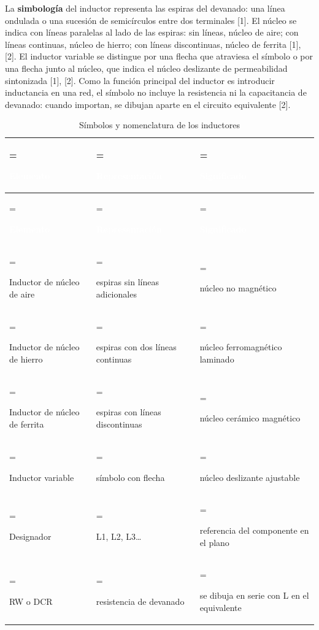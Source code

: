 \documentclass[11pt,letterpaper]{article}
\begin{document}
La \textbf{simbología} del inductor representa las espiras del devanado: una línea ondulada o una sucesión de semicírculos entre dos terminales [1]. El núcleo se indica con líneas paralelas al lado de las espiras: sin líneas, núcleo de aire; con líneas continuas, núcleo de hierro; con líneas discontinuas, núcleo de ferrita [1], [2]. El inductor variable se distingue por una flecha que atraviesa el símbolo o por una flecha junto al núcleo, que indica el núcleo deslizante de permeabilidad sintonizada [1], [2]. Como la función principal del inductor es introducir inductancia en una red, el símbolo no incluye la resistencia ni la capacitancia de devanado: cuando importan, se dibujan aparte en el circuito equivalente [2].

\begin{xltabular}{\linewidth}{>{\hsize\linewidth=\hsize\raggedright\arraybackslash}X>{\hsize\linewidth=\hsize\raggedright\arraybackslash}X>{\hsize\linewidth=\hsize\raggedright\arraybackslash}X}
\caption{Símbolos y nomenclatura de los inductores} \\
 \textcolor{white}{\textbf{Elemento}} & \textcolor{white}{\textbf{Representación}} & \textcolor{white}{\textbf{Significado}} \\
\endfirsthead
{} \textcolor{white}{\textbf{Elemento}} & \textcolor{white}{\textbf{Representación}} & \textcolor{white}{\textbf{Significado}} \\
\endhead
\bottomrule
\endlastfoot
  Inductor de núcleo de aire & espiras sin líneas adicionales & núcleo no magnético \\
   Inductor de núcleo de hierro & espiras con dos líneas continuas & núcleo ferromagnético laminado \\
  Inductor de núcleo de ferrita & espiras con líneas discontinuas & núcleo cerámico magnético \\
   Inductor variable & símbolo con flecha & núcleo deslizante ajustable \\
  Designador & L1, L2, L3\ldots{} & referencia del componente en el plano \\
   RW o DCR & resistencia de devanado & se dibuja en serie con L en el equivalente \\
\end{xltabular}
\end{document}
